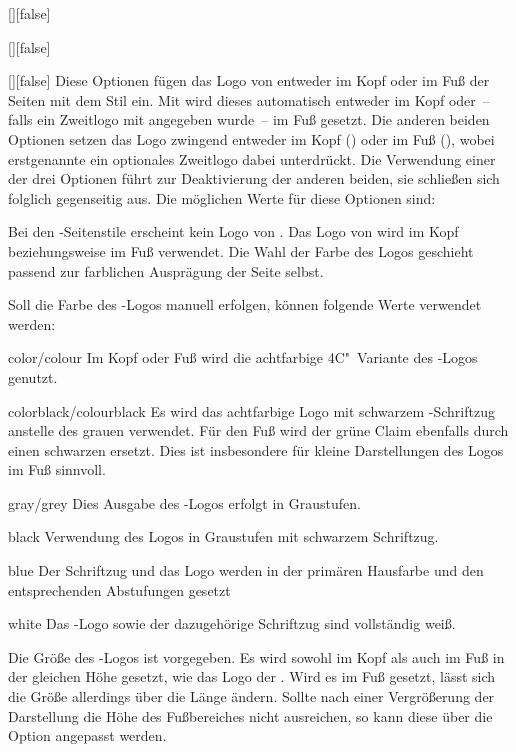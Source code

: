 \begin{Declaration}{[\PSet]}[false]
\begin{Declaration}[v2.02]{[\PSet]}[false]
\begin{Declaration}{[\PSet]}[false]
\printdeclarationlist%
%
%
Diese Optionen fügen das Logo von \DDC entweder im Kopf oder im Fuß der Seiten
mit dem Stil  ein. Mit  wird dieses 
automatisch entweder im Kopf oder~-- falls ein Zweitlogo mit  
angegeben wurde~-- im Fuß gesetzt. Die anderen beiden Optionen setzen das Logo 
zwingend entweder im Kopf () oder im Fuß (), 
wobei erstgenannte ein optionales Zweitlogo dabei unterdrückt. Die Verwendung 
einer der drei Optionen führt zur Deaktivierung der anderen beiden, sie 
schließen sich folglich gegenseitig aus. Die möglichen Werte für diese Optionen 
sind:
%
\begin{values}
\itemfalse
  Bei den -Seitenstile erscheint kein Logo von \DDC.
\itemtrue*
  Das Logo von \DDC wird im Kopf beziehungsweise im Fuß verwendet. Die Wahl der 
  Farbe des Logos geschieht passend zur farblichen Ausprägung der Seite selbst.
\end{values}
%
Soll die Farbe des \DDC-Logos manuell erfolgen, können folgende Werte verwendet 
werden:
%
\begin{values}
\item[color/colour]
  Im Kopf oder Fuß wird die achtfarbige 4C"~Variante des \DDC-Logos genutzt.
\item[colorblack/colourblack]
  Es wird das achtfarbige Logo mit schwarzem \DDC-Schriftzug anstelle des 
  grauen verwendet. Für den Fuß wird der grüne Claim ebenfalls durch einen 
  schwarzen ersetzt. Dies ist insbesondere für kleine Darstellungen des Logos 
  im Fuß sinnvoll.
\item[gray/grey]
  Dies Ausgabe des \DDC-Logos erfolgt in Graustufen.
\item[black]
  Verwendung des Logos in Graustufen mit schwarzem Schriftzug.
\item[blue]
  Der Schriftzug und das Logo werden in der primären Hausfarbe  
  und den entsprechenden Abstufungen gesetzt
\item[white]
  Das \DDC-Logo sowie der dazugehörige Schriftzug sind vollständig weiß.
\end{values}
%
Die Größe des \DDC-Logos ist vorgegeben. Es wird sowohl im Kopf als auch im Fuß 
in der gleichen Höhe gesetzt, wie das Logo der \TnUD. Wird es im Fuß gesetzt, 
lässt sich die Größe allerdings über die Länge  ändern. 
Sollte nach einer Vergrößerung der Darstellung die Höhe des Fußbereiches nicht 
ausreichen, so kann diese über die Option  angepasst 
werden.

\end{Declaration}
\end{Declaration}
\end{Declaration}

